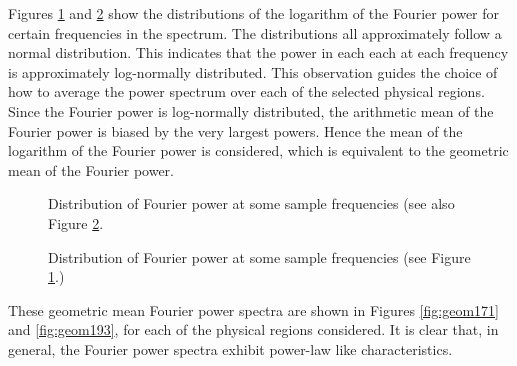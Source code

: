 \documentclass[manuscript]{../aastex52/aastex}
\begin{document}
Figures \ref{fig:dist171} and \ref{fig:dist193} show the distributions
of the logarithm of the Fourier power for certain frequencies in the
spectrum.  The distributions all approximately follow a normal
distribution.  This indicates that the power in each each at each
frequency is approximately log-normally distributed.  This observation
guides the choice of how to average the power spectrum over each of
the selected physical regions.  Since the Fourier power is
log-normally distributed, the arithmetic mean of the Fourier power is
biased by the very largest powers.  Hence the mean of the logarithm of
the Fourier power is considered, which is equivalent to the geometric
mean of the Fourier power.

\begin{figure}
\label{fig:dist171}
\caption{Distribution of Fourier power at some sample frequencies (see also Figure \ref{fig:dist193}.}
\end{figure}

\begin{figure}
\label{fig:dist193}
\caption{Distribution of Fourier power at some sample frequencies (see Figure \ref{fig:dist171}.)}
\end{figure}

These geometric mean Fourier power spectra are shown in Figures
\ref{fig:geom171} and \ref{fig:geom193}, for each of the physical
regions considered.  It is clear that, in general, the Fourier power
spectra exhibit power-law like characteristics.

\begin{figure}
\label{fig:fit171}
\plottwo{}{}
\plottwo{}{}
\caption{}
\end{figure}

\begin{figure}
\label{fig:fit193}
\plottwo{}{}
\plottwo{}{}

\caption{}
\end{figure}
\end{document}
